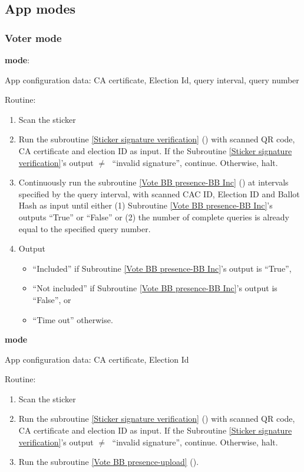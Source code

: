 \documentclass{article}
\begin{document}
    

\subsection{App modes}
\subsubsection{Voter mode}

\textbf{\BBInclusionCheck{} mode}:


App configuration data: CA certificate, Election Id, query interval, query number


Routine:
\begin{enumerate}
    \item Scan the sticker
    \item Run the subroutine \ref{Sticker signature verification} (\StickersignatureVerification{}) with scanned QR code, CA certificate and election ID as input. If the Subroutine \ref{Sticker signature verification}'s output $\neq\;$ ``invalid signature'', continue. Otherwise, halt.
    \item Continuously run the subroutine \ref{Vote BB presence-BB Inc} (\BBInclusionCheck{}) at intervals specified by the query interval, with scanned CAC ID, Election ID and Ballot Hash as input until either (1) Subroutine \ref{Vote BB presence-BB Inc}'s outputs ``True'' or ``False'' or (2) the number of complete queries is already equal to the specified query number. 
    \item Output 
    \begin{itemize}
        \item ``Included'' if Subroutine \ref{Vote BB presence-BB Inc}'s output is ``True'',
        \item ``Not included'' if Subroutine \ref{Vote BB presence-BB Inc}'s output is ``False'', or
        \item ``Time out'' otherwise.
    \end{itemize}
    
\end{enumerate}

\textbf{\StickerBBUpload{}{} mode}

App configuration data: CA certificate, Election Id


Routine:
\begin{enumerate}
    \item Scan the sticker
    \item Run the subroutine \ref{Sticker signature verification} (\StickersignatureVerification{}) with scanned QR code, CA certificate and election ID as input. If the Subroutine \ref{Sticker signature verification}'s output $\neq\;$ ``invalid signature'', continue. Otherwise, halt.
    \item Run the subroutine \ref{Vote BB presence-upload} (\StickerBBUpload{}).
\end{enumerate}
\end{document}
